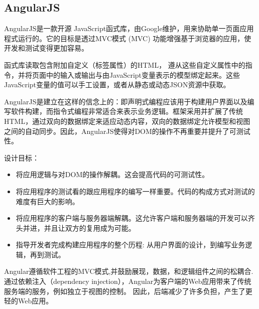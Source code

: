 \subsection{AngularJS}\label{sec:angularjs}
AngularJS是一款开源 JavaScript函式库，由Google维护，用来协助单一页面应用程式运行的。它的目标是透过MVC模式 (MVC) 功能增强基于浏览器的应用，使开发和测试变得更加容易。

函式库读取包含附加自定义（标签属性）的HTML， 遵从这些自定义属性中的指令，并将页面中的输入或输出与由JavaScript变量表示的模型绑定起来。这些JavaScript变量的值可以手工设置，或者从静态或动态JSON资源中获取。

AngularJS是建立在这样的信念上的：即声明式编程应该用于构建用户界面以及编写软件构建，而指令式编程非常适合来表示业务逻辑。框架采用并扩展了传统HTML，通过双向的数据绑定来适应动态内容，双向的数据绑定允许模型和视图之间的自动同步。因此，AngularJS使得对DOM的操作不再重要并提升了可测试性。

设计目标：
\begin{itemize}
	\item 将应用逻辑与对DOM的操作解耦。这会提高代码的可测试性。
	\item 将应用程序的测试看的跟应用程序的编写一样重要。代码的构成方式对测试的难度有巨大的影响。
	\item 将应用程序的客户端与服务器端解耦。这允许客户端和服务器端的开发可以齐头并进，并且让双方的复用成为可能。
	\item 指导开发者完成构建应用程序的整个历程: 从用户界面的设计，到编写业务逻辑，再到测试。
\end{itemize}

Angular遵循软件工程的MVC模式,并鼓励展现，数据，和逻辑组件之间的松耦合.通过依赖注入（dependency injection），Angular为客户端的Web应用带来了传统服务端的服务，例如独立于视图的控制。 因此，后端减少了许多负担，产生了更轻的Web应用。